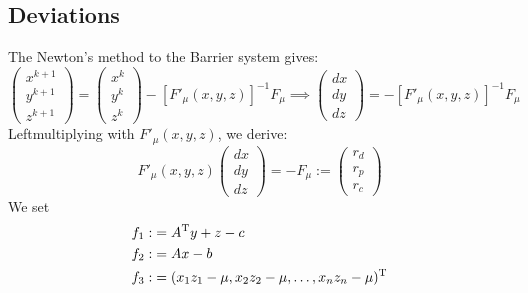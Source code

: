 \subsection*{Deviations}
The Newton's method  to the Barrier system gives:
\[
\begin{pmatrix}
x^{k+1}\\y^{k+1}\\z^{k+1}
\end{pmatrix}
=
\begin{pmatrix}
x^{k}\\y^{k}\\z^{k}
\end{pmatrix}
-
[F'_{\mu}(x,y,z)]^{-1}F_{\mu}\implies
\begin{pmatrix}
dx\\dy\\dz
\end{pmatrix}=
-[F'_{\mu}(x,y,z)]^{-1}F_{\mu}
\]
Leftmultiplying with $F'_{\mu}(x,y,z)$, we derive:
\[
F'_{\mu}(x,y,z)\begin{pmatrix}
dx\\dy\\dz
\end{pmatrix}
=
-F_\mu:=\begin{pmatrix}
r_d\\r_p\\r_c
\end{pmatrix}
\]
We set 
\begin{align*}
f_1:&=A^{\mathrm T} y+z-c\\
f_2:&=Ax-b\\
f_3:&=(x_1z_1-\mu,x_2z_2-\mu,\dots,x_nz_n-\mu)^{\mathrm T}
\end{align*}
